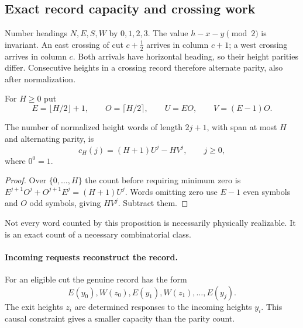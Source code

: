 \subsection{Exact record capacity and crossing work}
Number headings $N,E,S,W$ by $0,1,2,3$. The value $h-x-y\pmod2$ is invariant.
An east crossing of cut $c+\tfrac12$ arrives in column $c+1$; a west crossing
arrives in column $c$. Both arrivals have horizontal heading, so their height
parities differ. Consecutive heights in a crossing record therefore alternate
parity, also after normalization.

For $H\ge0$ put
\[
 E=\lfloor H/2\rfloor+1,\qquad O=\lceil H/2\rceil,
 \qquad U=EO,\qquad V=(E-1)O.
\]
\begin{proposition}\label{cross:prop:count}
The number of normalized height words of length $2j+1$, with span at most $H$
and alternating parity, is
\[
 c_H(j)=(H+1)U^j-HV^j,\qquad j\ge0,
\]
where $0^0=1$.
\end{proposition}
\begin{proof}
Over $\{0,\ldots,H\}$ the count before requiring minimum zero is
$E^{j+1}O^j+O^{j+1}E^j=(H+1)U^j$. Words omitting zero use $E-1$ even symbols
and $O$ odd symbols, giving $HV^j$. Subtract them.
\end{proof}
Not every word counted by this proposition is necessarily physically
realizable. It is an exact count of a necessary combinatorial class.

\paragraph{Incoming requests reconstruct the record.}
For an eligible cut the genuine record has the form
\[
 E(y_0),W(z_0),E(y_1),W(z_1),\ldots,E(y_j).
\]
The exit heights $z_i$ are determined responses to the incoming heights $y_i$.
This causal constraint gives a smaller capacity than the parity count.

